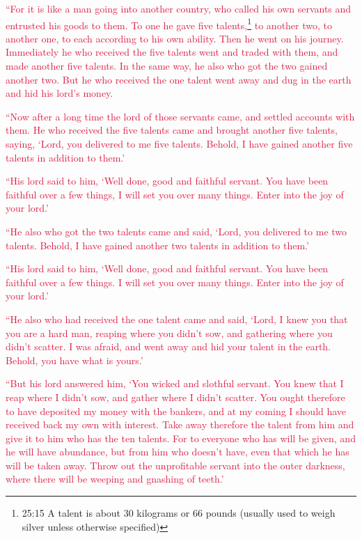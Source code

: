 \myverse{}\textcolor{crimson}{“For it is like a man going into another country, who called
	his own servants and entrusted his goods to them.
}
\myverse{}\textcolor{crimson}{To one he gave five talents,}\footnote{25:15 A talent is about 30 kilograms or 66 pounds (usually used to weigh silver unless otherwise specified)}
\textcolor{crimson}{to another two, to another one, to each according to his own ability. Then he went on his journey.
}
\myverse{}\textcolor{crimson}{Immediately he who received the five talents went and traded with them,
	and made another five talents.
}
\myverse{}\textcolor{crimson}{In the same way, he also who got the two gained another two.
}
\myverse{}\textcolor{crimson}{But he who received the one talent went away and dug in the earth and
	hid his lord’s money.}

\myverse{}\textcolor{crimson}{“Now after a long time the lord of those servants came,
	and settled accounts with them.
}
\myverse{}\textcolor{crimson}{He who received the five talents came and brought another five talents,
	saying, ‘Lord, you delivered to me five talents. Behold, I have gained another five talents in addition
	to them.’}

\myverse{}\textcolor{crimson}{“His lord said to him, ‘Well done, good and faithful servant.
	You have been faithful over a few things, I will set you over many things. Enter into the joy of your
	lord.’}

\myverse{}\textcolor{crimson}{“He also who got the two talents came and said, ‘Lord, you
	delivered to me two talents. Behold, I have gained another two talents in addition to them.’
}

\myverse{}\textcolor{crimson}{“His lord said to him, ‘Well done, good and faithful servant.
	You have been faithful over a few things. I will set you over many things. Enter into the joy of your
	lord.’}

\myverse{}\textcolor{crimson}{“He also who had received the one talent came and said,
	‘Lord, I knew you that you are a hard man, reaping where you didn’t sow, and gathering where you didn’t
	scatter.
}
\myverse{}\textcolor{crimson}{I was afraid, and went away and hid your talent in the earth. Behold,
	you have what is yours.’}

\myverse{}\textcolor{crimson}{“But his lord answered him, ‘You wicked and slothful servant.
	You knew that I reap where I didn’t sow, and gather where I didn’t scatter.
}
\myverse{}\textcolor{crimson}{You ought therefore to have deposited my money with the bankers, and
	at my coming I should have received back my own with interest.
}
\myverse{}\textcolor{crimson}{Take away therefore the talent from him and give it to him who has the
	ten talents.
}
\myverse{}\textcolor{crimson}{For to everyone who has will be given, and he will have abundance, but
	from him who doesn’t have, even that which he has will be taken away.
}
\myverse{}\textcolor{crimson}{Throw out the unprofitable servant into the outer darkness, where there
	will be weeping and gnashing of teeth.’}

